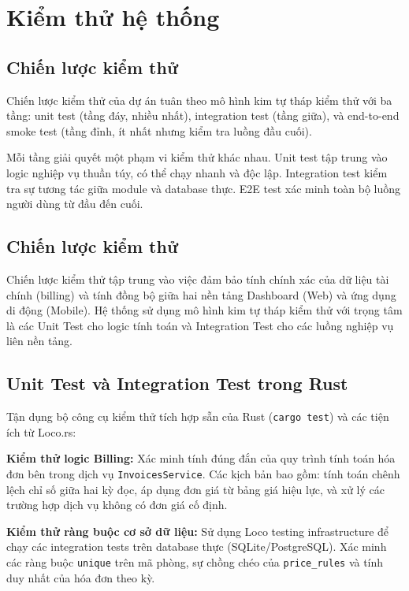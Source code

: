 \chapter{Kiểm thử hệ thống}\label{chapter_testing}

\section{Chiến lược kiểm thử}

Chiến lược kiểm thử của dự án tuân theo mô hình kim tự tháp kiểm thử với ba tầng: unit test (tầng đáy, nhiều nhất), integration test (tầng giữa), và end-to-end smoke test (tầng đỉnh, ít nhất nhưng kiểm tra luồng đầu cuối).

Mỗi tầng giải quyết một phạm vi kiểm thử khác nhau. Unit test tập trung vào logic nghiệp vụ thuần túy, có thể chạy nhanh và độc lập. Integration test kiểm tra sự tương tác giữa module và database thực. E2E test xác minh toàn bộ luồng người dùng từ đầu đến cuối.

\section{Chiến lược kiểm thử}

Chiến lược kiểm thử tập trung vào việc đảm bảo tính chính xác của dữ liệu tài chính (billing) và tính đồng bộ giữa hai nền tảng Dashboard (Web) và ứng dụng di động (Mobile). Hệ thống sử dụng mô hình kim tự tháp kiểm thử với trọng tâm là các Unit Test cho logic tính toán và Integration Test cho các luồng nghiệp vụ liên nền tảng.

\section{Unit Test và Integration Test trong Rust}

Tận dụng bộ công cụ kiểm thử tích hợp sẵn của Rust (\texttt{cargo test}) và các tiện ích từ Loco.rs:

\textbf{Kiểm thử logic Billing:} Xác minh tính đúng đắn của quy trình tính toán hóa đơn bên trong dịch vụ \texttt{InvoicesService}. Các kịch bản bao gồm: tính toán chênh lệch chỉ số giữa hai kỳ đọc, áp dụng đơn giá từ bảng giá hiệu lực, và xử lý các trường hợp dịch vụ không có đơn giá cố định.

\textbf{Kiểm thử ràng buộc cơ sở dữ liệu:} Sử dụng Loco testing infrastructure để chạy các integration tests trên database thực (SQLite/PostgreSQL). Xác minh các ràng buộc \texttt{unique} trên mã phòng, sự chồng chéo của \texttt{price\_rules} và tính duy nhất của hóa đơn theo kỳ.

